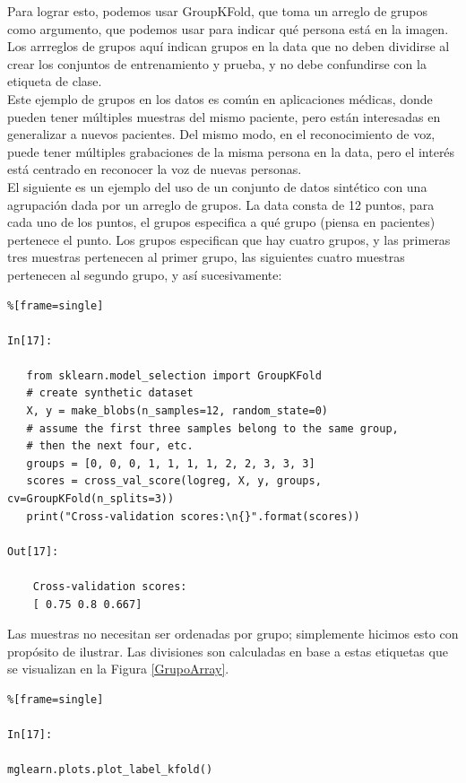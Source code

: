  
Para lograr esto, podemos usar {\ttfamily GroupKFold}, que toma un arreglo de grupos como argumento, que podemos usar para indicar qué persona está en la imagen. Los arrreglos de grupos aquí indican  grupos en la data  que no deben dividirse al crear los conjuntos de entrenamiento y prueba, y no debe confundirse con la etiqueta de clase. \\



 Este ejemplo de grupos en los datos es común en aplicaciones médicas, donde
pueden tener múltiples muestras del mismo paciente, pero están interesadas en generalizar
a nuevos pacientes. Del mismo modo, en el reconocimiento de voz, puede tener múltiples grabaciones
de la  misma persona en la data, pero el interés está centrado  en reconocer la voz de nuevas personas.\\


El siguiente es un ejemplo del uso de un conjunto de datos sintético con una agrupación dada por
un arreglo de grupos. La data  consta de 12 puntos,  para cada uno de los puntos, 
el grupos especifica a qué grupo (piensa en pacientes) pertenece el punto. Los grupos especifican
que hay cuatro grupos, y las primeras tres muestras pertenecen al primer grupo, las siguientes cuatro muestras pertenecen al segundo grupo, y así sucesivamente:

\begin{lstlisting}%[frame=single]

In[17]:

   from sklearn.model_selection import GroupKFold
   # create synthetic dataset
   X, y = make_blobs(n_samples=12, random_state=0)
   # assume the first three samples belong to the same group,
   # then the next four, etc.
   groups = [0, 0, 0, 1, 1, 1, 1, 2, 2, 3, 3, 3]
   scores = cross_val_score(logreg, X, y, groups, cv=GroupKFold(n_splits=3))
   print("Cross-validation scores:\n{}".format(scores))

Out[17]:

    Cross-validation scores:
    [ 0.75 0.8 0.667]

\end{lstlisting}


Las muestras no necesitan ser ordenadas por grupo; simplemente hicimos esto con propósito de ilustrar. Las divisiones son calculadas en base a estas etiquetas que se visualizan en la Figura \ref{GrupoArray}.

\begin{lstlisting}%[frame=single]

In[17]:

mglearn.plots.plot_label_kfold()


\end{lstlisting}%


